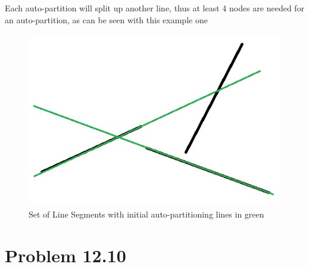 \documentclass[11pt,psfig]{article}
\begin{document}
Each auto-partition will split up another line, thus at least 4 nodes are needed for an auto-partition, as can be seen with this example one
\begin{figure}[H]
\centering
\includegraphics[height=3in]{hw6prob3diagram3.jpg}
\caption{Set of Line Segments with initial auto-partitioning lines in green}
\end{figure}

\section*{Problem 12.10}
\end{document}

